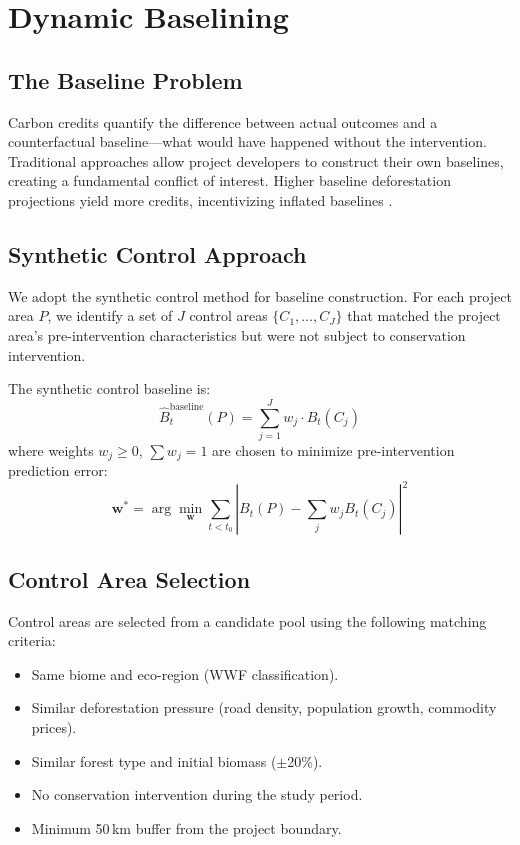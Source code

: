 \section{Dynamic Baselining}

\label{sec:baselines}

\subsection{The Baseline Problem}

Carbon credits quantify the difference between actual outcomes and a
counterfactual baseline---what would have happened without the
intervention. Traditional approaches allow project developers to
construct their own baselines, creating a fundamental conflict of
interest. Higher baseline deforestation projections yield more credits,
incentivizing inflated baselines \citep{west2023action}.

\subsection{Synthetic Control Approach}

We adopt the synthetic control method \citep{abadie2010synthetic} for
baseline construction. For each project area $P$, we identify a set of
$J$ control areas $\{C_1, \ldots, C_J\}$ that matched the project area's
pre-intervention characteristics but were not subject to conservation
intervention.

The synthetic control baseline is:
\begin{equation}
  \hat{B}_t^{\text{baseline}}(P) = \sum_{j=1}^{J} w_j \cdot B_t(C_j)
\end{equation}
where weights $w_j \geq 0$, $\sum w_j = 1$ are chosen to minimize
pre-intervention prediction error:
\begin{equation}
  \mathbf{w}^* = \arg\min_{\mathbf{w}} \sum_{t < t_0}
  \left| B_t(P) - \sum_j w_j B_t(C_j) \right|^2
\end{equation}

\subsection{Control Area Selection}

Control areas are selected from a candidate pool using the following
matching criteria:
\begin{itemize}
  \item Same biome and eco-region (WWF classification).
  \item Similar deforestation pressure (road density, population growth,
    commodity prices).
  \item Similar forest type and initial biomass ($\pm$20\%).
  \item No conservation intervention during the study period.
  \item Minimum 50\,km buffer from the project boundary.
\end{itemize}

